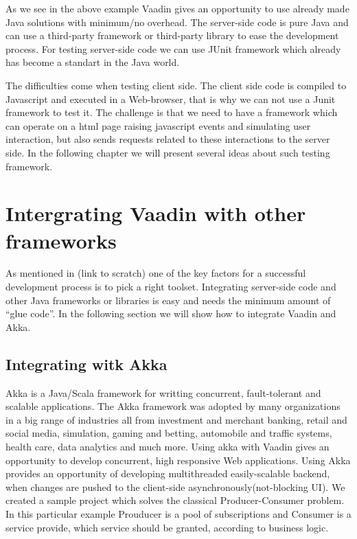 	
	   As we see in the above example Vaadin gives an opportunity to use already
    made Java solutions with minimum/no overhead. The server-side code is pure
    Java and can use a third-party framework or third-party library to ease the
    development process. For testing server-side code we can use JUnit framework
    which already has become a standart in the Java world.
    
    The difficulties come when testing client side. The client side code is
    compiled to Javascript and executed in a Web-browser, that is why we can not
    use a Junit framework to test it. The challenge is that we need to have a
    framework which can operate on a html page raising javascript events and
    simulating user interaction, but also sends requests related to these
    interactions to the server side. In the following chapter we will
    present several ideas about such testing framework.  
	
	\section {Intergrating Vaadin with other frameworks}
	  As mentioned in (link to scratch) one of the key factors for a successful
	  development process is to pick a right toolset. Integrating server-side
	  code and other Java frameworks or libraries is easy and needs the minimum
	  amount of ``glue code''. In the following section we will show how to
	  integrate Vaadin and Akka.
	   
	  \subsection {Integrating witk Akka}
	  Akka is a Java/Scala framework for writting concurrent, fault-tolerant and
	  scalable applications. The Akka framework was adopted by many organizations
	  in a big range of industries all from investment and merchant banking, retail and social media,
	   simulation, gaming and betting, automobile and traffic systems, health care,
	   data analytics and much more\cite {akkakUseCases}. Using akka with Vaadin
	   gives an opportunity to develop concurrent, high responsive Web
	   applications. Using Akka provides an
	   opportunity of developing multithreaded easily-scalable backend, when
	   changes are pushed to the client-side asynchronously(not-blocking UI). 
	   We created a sample project which solves the classical Producer-Consumer
	   problem. In this particular example Prouducer is a pool of subscriptions and
	   Consumer is a service provide, which service should be granted, according to
	   business logic.
	   
